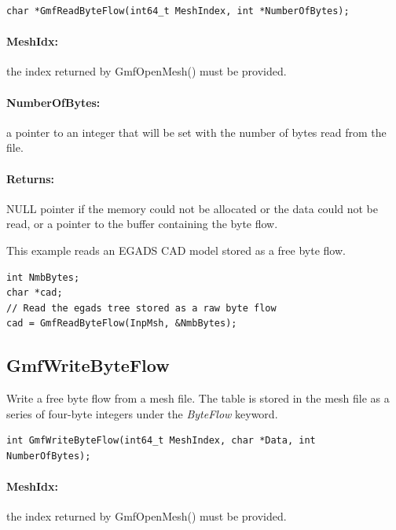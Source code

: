 \documentclass[a4paper,12pt]{article}
\begin{document}
\begin{tt}
\begin{verbatim}
char *GmfReadByteFlow(int64_t MeshIndex, int *NumberOfBytes);
\end{verbatim}
\end{tt}
\normalfont

\paragraph{MeshIdx:}
the index returned by GmfOpenMesh() must be provided.

\paragraph{NumberOfBytes:} a pointer to an integer that will be set with the number of bytes read from the file.

\paragraph{Returns:} NULL pointer if the memory could not be allocated or the data could not be read, or a pointer to the buffer containing the byte flow.

This example reads an EGADS CAD model stored as a free byte flow.

\begin{tt}
\begin{verbatim}
int NmbBytes;
char *cad;
// Read the egads tree stored as a raw byte flow
cad = GmfReadByteFlow(InpMsh, &NmbBytes);
\end{verbatim}
\end{tt}
\normalfont


\subsection{GmfWriteByteFlow}
Write a free byte flow from a mesh file.
The table is stored in the mesh file as a series of four-byte integers under the \emph{ByteFlow} keyword.

\begin{tt}
\begin{verbatim}
int GmfWriteByteFlow(int64_t MeshIndex, char *Data, int NumberOfBytes);
\end{verbatim}
\end{tt}
\normalfont

\paragraph{MeshIdx:}
the index returned by GmfOpenMesh() must be provided.
\end{document}
